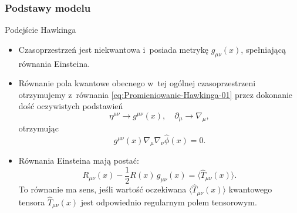 \documentclass[10pt,t]{beamer}
\begin{document}
\begin{frame}
  \frametitle{Podstawy modelu}


  Podejście Hawkinga
  \begin{itemize}
    \RaggedRight

  \item Czasoprzestrzeń jest niekwantowa i~posiada metrykę
    $g_{ \mu \nu }( x )$, spełniającą równania Einsteina.

  \item Równanie pola kwantowe obecnego w~tej ogólnej
    czasoprzestrzeni otrzymujemy z~równania
    \eqref{eq:Promieniowanie-Hawkinga-01} przez dokonanie dość
    oczywistych podstawień
    \begin{equation}
      \label{eq:Promieniowanie-Hawkinga-02}
      \eta^{ \mu \nu } \to g^{ \mu \nu }( x ), \quad
      \partial_{ \mu } \to \nabla_{ \mu },
    \end{equation}
    otrzymując
    \begin{equation}
      \label{eq:Promieniowanie-Hawkinga-03}
      g^{ \mu \nu }( x ) \nabla_{ \mu } \nabla_{ \nu }
      \widehat{ \phi }( x ) = 0.
    \end{equation}

  \item Równania Einsteina mają postać:
    \begin{equation}
      \label{eq:Promieniowanie-Hawkinga-04}
      R_{ \mu \nu }( x ) - \frac{ 1 }{ 2 } R( x )\, g_{ \mu \nu }( x )
      = \langle \widehat{ T }_{ \mu \nu }( x ) \rangle.
    \end{equation}
    To równanie ma sens, jeśli wartość oczekiwana
    $\langle \widehat{ T }_{ \mu \nu }( x ) \rangle$ kwantowego
    tensora $\widehat{ T }_{ \mu \nu }( x )$ jest odpowiednio
    regularnym polem tensorowym.

  \end{itemize}

\end{frame}
\end{document}
